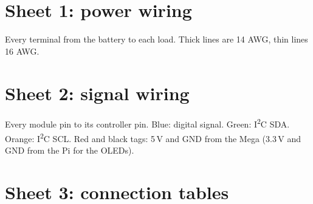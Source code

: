 \documentclass[10pt,a4paper]{article}
\begin{document}
\section{Sheet 1: power wiring}
Every terminal from the battery to each load. Thick lines are 14 AWG, thin lines 16 AWG.
\begin{center}\end{center}
\clearpage
\section{Sheet 2: signal wiring}
Every module pin to its controller pin. Blue: digital signal. Green: I\textsuperscript{2}C SDA. Orange: I\textsuperscript{2}C SCL. Red and black tags: 5\,V and GND from the Mega (3.3\,V and GND from the Pi for the OLEDs).
\begin{center}\end{center}
\clearpage
\section{Sheet 3: connection tables}

\end{document}
